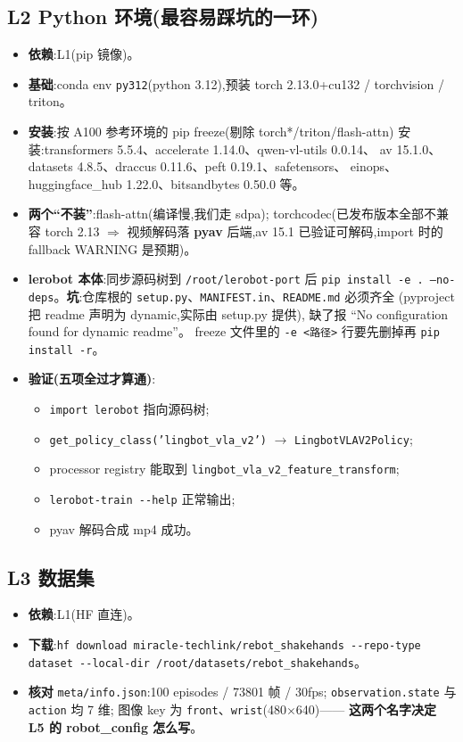 \documentclass[11pt]{ctexart}
\begin{document}
\subsection{L2 Python 环境(最容易踩坑的一环)}
\begin{itemize}
\item \textbf{依赖}:L1(pip 镜像)。
\item \textbf{基础}:conda env \texttt{py312}(python 3.12),预装
torch 2.13.0+cu132 / torchvision / triton。
\item \textbf{安装}:按 A100 参考环境的 pip freeze(剔除 torch*/triton/flash-attn)
安装:transformers 5.5.4、accelerate 1.14.0、qwen-vl-utils 0.0.14、
av 15.1.0、datasets 4.8.5、draccus 0.11.6、peft 0.19.1、safetensors、
einops、huggingface\_hub 1.22.0、bitsandbytes 0.50.0 等。
\item \textbf{两个``不装''}:flash-attn(编译慢,我们走 sdpa);
torchcodec(已发布版本全部不兼容 torch 2.13 $\Rightarrow$ 视频解码落
\textbf{pyav} 后端,av 15.1 已验证可解码,import 时的 fallback WARNING 是预期)。
\item \textbf{lerobot 本体}:同步源码树到 \texttt{/root/lerobot-port} 后
\texttt{pip install -e . --no-deps}。\textbf{坑}:仓库根的
\texttt{setup.py}、\texttt{MANIFEST.in}、\texttt{README.md} 必须齐全
(pyproject 把 readme 声明为 dynamic,实际由 setup.py 提供),
缺了报 ``No configuration found for dynamic readme''。
freeze 文件里的 \texttt{-e <路径>} 行要先删掉再 \texttt{pip install -r}。
\item \textbf{验证(五项全过才算通)}:
\begin{itemize}[itemsep=0pt,topsep=1pt,parsep=0pt]
\item \texttt{import lerobot} 指向源码树;
\item \texttt{get\_policy\_class('lingbot\_vla\_v2')} $\to$ \texttt{LingbotVLAV2Policy};
\item processor registry 能取到 \texttt{lingbot\_vla\_v2\_feature\_transform};
\item \texttt{lerobot-train -{}-help} 正常输出;
\item pyav 解码合成 mp4 成功。
\end{itemize}
\end{itemize}

\subsection{L3 数据集}
\begin{itemize}
\item \textbf{依赖}:L1(HF 直连)。
\item \textbf{下载}:\texttt{hf download miracle-techlink/rebot\_shakehands
-{}-repo-type dataset -{}-local-dir /root/datasets/rebot\_shakehands}。
\item \textbf{核对} \texttt{meta/info.json}:100 episodes / 73801 帧 / 30fps;
\texttt{observation.state} 与 \texttt{action} 均 7 维;
图像 key 为 \texttt{front}、\texttt{wrist}(480$\times$640)——
\textbf{这两个名字决定 L5 的 robot\_config 怎么写}。
\end{itemize}
\end{document}
